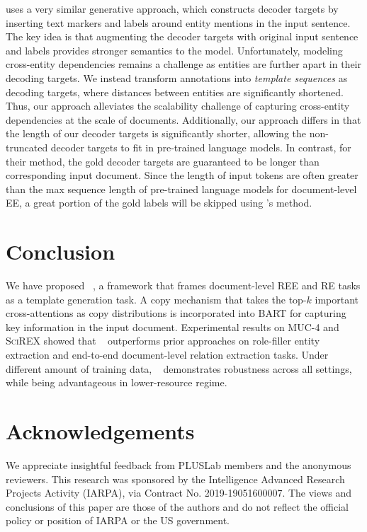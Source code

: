 \documentclass[11pt]{article}
\begin{document}
\citet{paolini2021structured} uses a very similar generative approach, which constructs decoder targets by inserting text markers and labels around entity mentions in the input sentence. The key idea is that augmenting the decoder targets with original input sentence and labels provides stronger semantics to the model. Unfortunately, modeling cross-entity dependencies remains a challenge as entities are further apart in their decoding targets. We instead transform annotations into \textit{template sequences} as decoding targets, where distances between entities are significantly shortened. Thus, our approach alleviates the scalability challenge of capturing cross-entity dependencies at the scale of documents. Additionally, our approach differs in that the length of our decoder targets is significantly shorter, allowing the non-truncated decoder targets to fit in pre-trained language models. In contrast, for their method, the gold decoder targets are guaranteed to be longer than corresponding input document. Since the length of input tokens are often greater than the max sequence length of pre-trained language models for document-level EE, a great portion of the gold labels will be skipped using \citet{paolini2021structured}'s method. 



%
 \section{Conclusion}
We have proposed \modelshort~, a framework that frames document-level REE and RE tasks as a template generation task. A copy mechanism that takes the top-$k$ important cross-attentions as copy distributions is incorporated into \textsc{BART} for capturing key information in the input document. Experimental results on MUC-4 and \textsc{SciREX} showed that \modelshort~ outperforms prior approaches on role-filler entity extraction and end-to-end document-level relation extraction tasks. Under different amount of training data, \modelshort~ demonstrates robustness across all settings, while being advantageous in lower-resource regime.

\section*{Acknowledgements}
We appreciate insightful feedback from PLUSLab members and the anonymous reviewers. This research was sponsored by the Intelligence Advanced Research Projects Activity (IARPA), via Contract No. 2019-19051600007. The views and conclusions of this paper are those of the authors and do not reflect the official policy or position of IARPA or the US government. 
\end{document}
